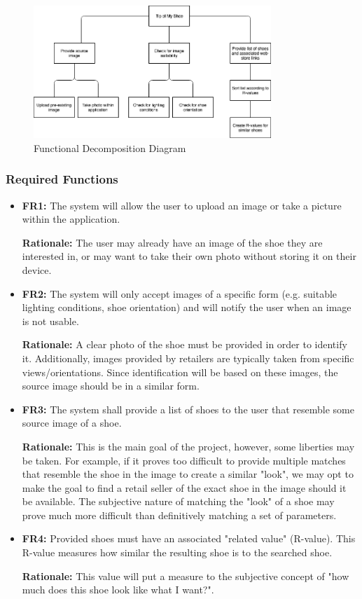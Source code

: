 \documentclass[12pt, titlepage]{article}
\begin{document}
\begin{figure}[H]
  \centering
  \includegraphics[width=0.8\textwidth]{images/Functional-Decomposition.png}
  \caption{Functional Decomposition Diagram}
\end{figure}


\subsubsection{Required Functions}
\begin{itemize}
    \item 
    \textbf{FR1:} The system will allow the user to upload an image or take a picture within the application. 
    
    \textbf{Rationale:} The user may already have an image of the shoe they are interested in, or may want to take their own photo without storing it on their device.
    
    \item 
    \textbf{FR2:} The system will only accept images of a specific form (e.g. suitable lighting conditions, shoe orientation) and will notify the user when an image is not usable. 
    
    \textbf{Rationale:} A clear photo of the shoe must be provided in order to identify it. Additionally, images provided by retailers are typically taken from specific views/orientations. Since identification will be based on these images, the source image should be in a similar form.
    
    \item 
    \textbf{FR3:} The system shall provide a list of shoes to the user that resemble some source image of a shoe. 
    
    \textbf{Rationale:} This is the main goal of the project, however, some liberties may be taken. For example, if it proves too difficult to provide multiple matches that resemble the shoe in the image to create a similar "look", we may opt to make the goal to find a retail seller of the exact shoe in the image should it be available. The subjective nature of matching the "look" of a shoe may prove much more difficult than definitively matching a set of parameters.
    
    \item 
    \textbf{FR4:} Provided shoes must have an associated "related value" (R-value). This R-value measures how similar the resulting shoe is to the searched shoe. 
    
    \textbf{Rationale:} This value will put a measure to the subjective concept of "how much does this shoe look like what I want?".
\end{itemize}
\end{document}
